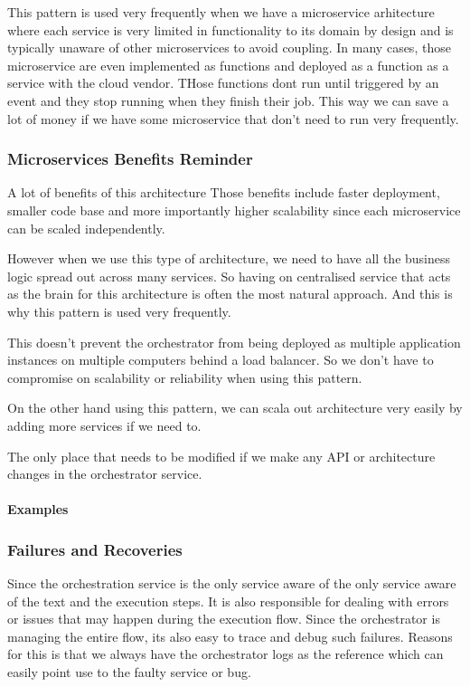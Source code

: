 This pattern is used very frequently when we have a microservice arhitecture where each service is very limited in functionality to its domain by design and is typically unaware of other microservices to avoid coupling.
In many cases, those microservice are even implemented as functions and deployed as a function as a service with the cloud vendor.
THose functions dont run until triggered by an event and they stop running when they finish their job.
This way we can save a lot of money if we have some microservice that don't need to run very frequently.

\subsubsection{Microservices Benefits Reminder}
A lot of benefits of this architecture
Those benefits include faster deployment, smaller code base and more importantly higher scalability since each microservice can be scaled independently.

However when we use this type of architecture, we need to have all the business logic spread out across many services.
So having on centralised service that acts as the brain for this architecture is often the most natural approach.
And this is why this pattern is used very frequently.

This doesn't prevent the orchestrator from being deployed as multiple application instances on multiple computers behind a load balancer.
So we don't have to compromise on scalability or reliability when using this pattern.

On the other hand using this pattern, we can scala out architecture very easily by adding more services if we need to.

The only place that needs to be modified if we make any API or architecture changes in the orchestrator service.

\paragraph{Examples}

\subsubsection{Failures and Recoveries}
Since the orchestration service is the only service aware of the only service aware of the text and the execution steps.
It is also responsible for dealing with errors or issues that may happen during the execution flow.
Since the orchestrator is managing the entire flow, its also easy to trace and debug such failures.
Reasons for this is that we always have the orchestrator logs as the reference which can easily point use to the faulty service or bug.

